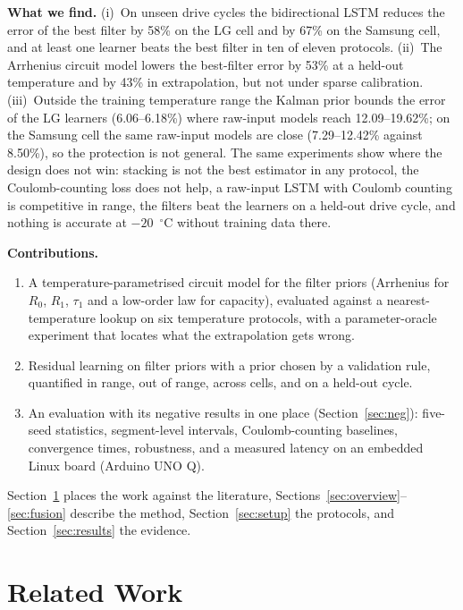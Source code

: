 \documentclass[journal]{IEEEtran}
\begin{document}
\textbf{What we find.}
(i)~On unseen drive cycles the bidirectional LSTM reduces the error of the best filter by 58\% on the LG cell and by 67\% on the Samsung cell, and at least one learner beats the best filter in ten of eleven protocols.
(ii)~The Arrhenius circuit model lowers the best-filter error by 53\% at a held-out temperature and by 43\% in extrapolation, but not under sparse calibration.
(iii)~Outside the training temperature range the Kalman prior bounds the error of the LG learners (6.06--6.18\%) where raw-input models reach 12.09--19.62\%; on the Samsung cell the same raw-input models are close (7.29--12.42\% against 8.50\%), so the protection is not general.
The same experiments show where the design does not win: stacking is not the best estimator in any protocol, the Coulomb-counting loss does not help, a raw-input LSTM with Coulomb counting is competitive in range, the filters beat the learners on a held-out drive cycle, and nothing is accurate at $-20$~$^\circ$C without training data there.

\textbf{Contributions.}
\begin{enumerate}
\item A temperature-parametrised circuit model for the filter priors (Arrhenius for $R_0$, $R_1$, $\tau_1$ and a low-order law for capacity), evaluated against a nearest-temperature lookup on six temperature protocols, with a parameter-oracle experiment that locates what the extrapolation gets wrong.
\item Residual learning on filter priors with a prior chosen by a validation rule, quantified in range, out of range, across cells, and on a held-out cycle.
\item An evaluation with its negative results in one place (Section~\ref{sec:neg}): five-seed statistics, segment-level intervals, Coulomb-counting baselines, convergence times, robustness, and a measured latency on an embedded Linux board (Arduino UNO Q).
\end{enumerate}
Section~\ref{sec:related} places the work against the literature, Sections~\ref{sec:overview}--\ref{sec:fusion} describe the method, Section~\ref{sec:setup} the protocols, and Section~\ref{sec:results} the evidence.

\section{Related Work}\label{sec:related}
\end{document}
